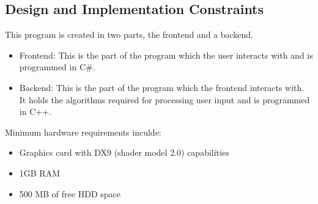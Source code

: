 \subsection{Design and Implementation Constraints}
This program is created in two parts, the frontend and a backend.
\begin{itemize}
    \item Frontend: This is the part of the program which the user interacts with
                    and is programmed in C\#.
    \item Backend: This is the part of the program which the frontend interacts
                    with. It holds the algorithms required for processing user input
                    and is programmed in C++.
\end{itemize}
Minimum hardware requirements inculde:
\begin{itemize}
    \item Graphics card with DX9 (shader model 2.0) capabilities
    \item 1GB RAM
    \item 500 MB of free HDD space
\end{itemize}

